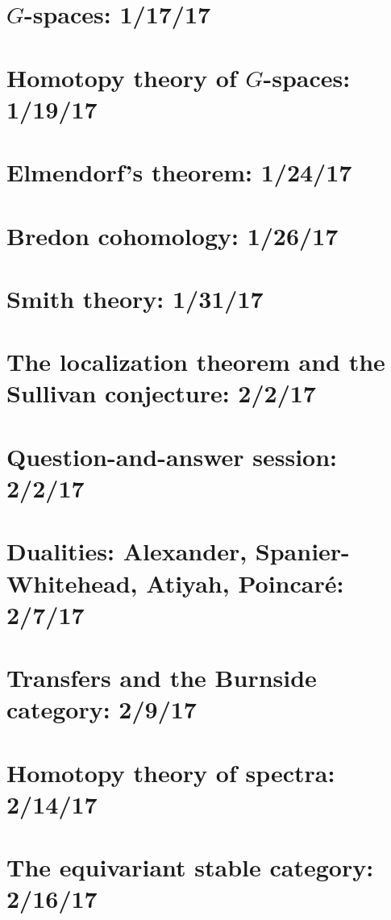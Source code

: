 \documentclass{style_EHT}
\begin{document}
\frontstuff

\section{\texorpdfstring{$G$}{G}-spaces: 1/17/17}
	
\section{Homotopy theory of \texorpdfstring{$G$}{G}-spaces: 1/19/17}
	
\section{Elmendorf's theorem: 1/24/17}
	
\section{Bredon cohomology: 1/26/17}
	
\section{Smith theory: 1/31/17}
	
\section{The localization theorem and the Sullivan conjecture: 2/2/17}
	
\section{Question-and-answer session: 2/2/17}
	
\section{Dualities: Alexander, Spanier-Whitehead, Atiyah, Poincaré: 2/7/17}
	
\section{Transfers and the Burnside category: 2/9/17}
	
\section{Homotopy theory of spectra: 2/14/17}
	
\section{The equivariant stable category: 2/16/17}
	
\end{document}
